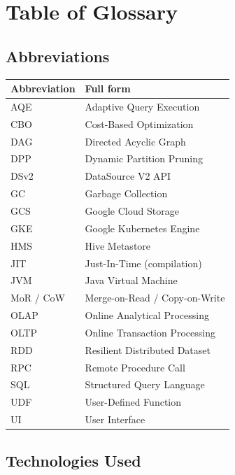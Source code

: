 \chapter*{Table of Glossary}

\section*{Abbreviations}

\begin{table}[H]
\centering
\footnotesize
\renewcommand{\arraystretch}{0.9}
\begin{tabular}{@{}p{3.2cm}p{10.7cm}@{}}
\toprule
\textbf{Abbreviation} & \textbf{Full form} \\
\midrule
AQE & Adaptive Query Execution \\
CBO & Cost-Based Optimization \\
DAG & Directed Acyclic Graph \\
DPP & Dynamic Partition Pruning \\
DSv2 & DataSource V2 API \\
GC & Garbage Collection \\
GCS & Google Cloud Storage \\
GKE & Google Kubernetes Engine \\
HMS & Hive Metastore \\
JIT & Just-In-Time (compilation) \\
JVM & Java Virtual Machine \\
MoR / CoW & Merge-on-Read / Copy-on-Write \\
OLAP & Online Analytical Processing \\
OLTP & Online Transaction Processing \\
RDD & Resilient Distributed Dataset \\
RPC & Remote Procedure Call \\
SQL & Structured Query Language \\
UDF & User-Defined Function \\
UI & User Interface \\
\bottomrule
\end{tabular}
\end{table}

\section*{Technologies Used}

